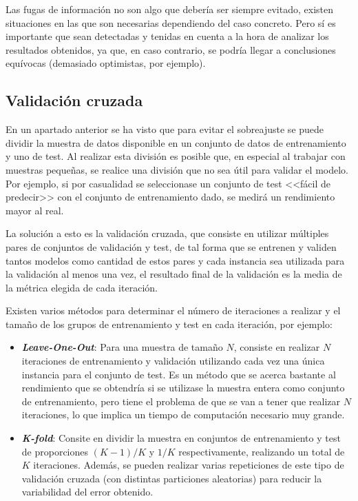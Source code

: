Las fugas de información no son algo que debería ser siempre evitado, existen
situaciones en las que son necesarias dependiendo del caso concreto. Pero sí es
importante que sean detectadas y tenidas en cuenta a la hora de analizar los
resultados obtenidos, ya que, en caso contrario, se podría llegar a conclusiones
equívocas (demasiado optimistas, por ejemplo).

\subsection{Validación cruzada}

En un apartado anterior se ha visto que para evitar el sobreajuste se puede
dividir la muestra de datos disponible en un conjunto de datos de entrenamiento
y uno de test. Al realizar esta división es posible que, en especial al trabajar
con muestras pequeñas, se realice una división que no sea útil para validar el
modelo. Por ejemplo, si por casualidad se seleccionase un conjunto de test
<<fácil de predecir>> con el conjunto de entrenamiento dado, se medirá un
rendimiento mayor al real.

La solución a esto es la validación cruzada, que consiste en utilizar múltiples
pares de conjuntos de validación y test, de tal forma que se entrenen y validen
tantos modelos como cantidad de estos pares y cada instancia sea utilizada para
la validación al menos una vez, el resultado final de la validación es la media
de la métrica elegida de cada iteración.

Existen varios métodos para determinar el número de iteraciones a realizar y el
tamaño de los grupos de entrenamiento y test en cada iteración, por ejemplo:

\begin{itemize}
    \item \textbf{\textit{Leave-One-Out}}: Para una muestra de tamaño $N$,
    consiste en realizar $N$ iteraciones de entrenamiento y validación
    utilizando cada vez una única instancia para el conjunto de test. Es un
    método que se acerca bastante al rendimiento que se obtendría si se
    utilizase la muestra entera como conjunto de entrenamiento, pero tiene el
    problema de que se van a tener que realizar $N$ iteraciones, lo que implica
    un tiempo de computación necesario muy grande.
    \item \textbf{\textit{K-fold}}: Consite en dividir la muestra en conjuntos
    de entrenamiento y test de proporciones $(K-1)/K$ y $1/K$ respectivamente,
    realizando un total de $K$ iteraciones. Además, se pueden realizar varias
    repeticiones de este tipo de validación cruzada (con distintas particiones
    aleatorias) para reducir la variabilidad del error obtenido.
\end{itemize}

